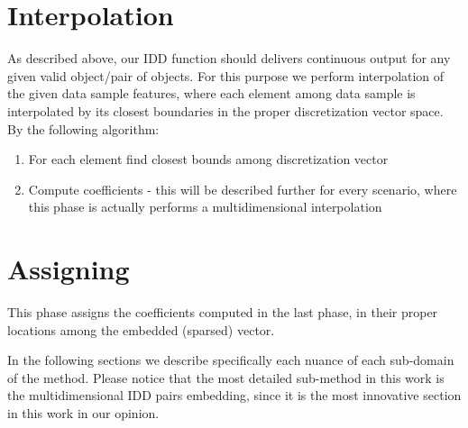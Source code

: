 \section{Interpolation}

As described above, our IDD function should delivers continuous output for any given valid object/pair of objects. 
For this purpose we perform interpolation of the given data sample features, where each element among data sample is interpolated by its closest boundaries in the proper discretization vector space. By the following algorithm:

\begin{enumerate}
	\item For each element find closest bounds among discretization vector
	\item Compute coefficients - this will be described further for every scenario, where this phase is actually performs a multidimensional interpolation
	
\end{enumerate}
\section{Assigning}

This phase assigns the coefficients computed in the last phase, in their proper locations among the embedded (sparsed) vector.

In the following sections we describe specifically each nuance of each sub-domain of the method. Please notice that the most detailed sub-method in this work is the multidimensional IDD pairs embedding, since it is the most innovative section in this work in our opinion.

